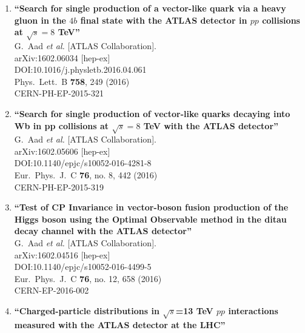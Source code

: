 \documentclass{article}
\begin{document}
\begin{enumerate}
\item%
{\bf ``Search for single production of a vector-like quark via a heavy gluon in the $4b$ final state with the ATLAS detector in $pp$ collisions at $\sqrt{s} = 8$ TeV''}
  \\{}G.~Aad {\it et al.} [ATLAS Collaboration].
  \\{}arXiv:1602.06034 [hep-ex]
  \\{}DOI:10.1016/j.physletb.2016.04.061
  \\{}Phys.\ Lett.\ B {\bf 758}, 249 (2016)
  \\{}CERN-PH-EP-2015-321
\item%
{\bf ``Search for single production of vector-like quarks decaying into Wb in pp collisions at $\sqrt{s} = 8$  TeV with the ATLAS detector''}
  \\{}G.~Aad {\it et al.} [ATLAS Collaboration].
  \\{}arXiv:1602.05606 [hep-ex]
  \\{}DOI:10.1140/epjc/s10052-016-4281-8
  \\{}Eur.\ Phys.\ J.\ C {\bf 76}, no. 8, 442 (2016)
  \\{}CERN-PH-EP-2015-319
\item%
{\bf ``Test of CP Invariance in vector-boson fusion production of the Higgs boson using the Optimal Observable method in the ditau decay channel with the ATLAS detector''}
  \\{}G.~Aad {\it et al.} [ATLAS Collaboration].
  \\{}arXiv:1602.04516 [hep-ex]
  \\{}DOI:10.1140/epjc/s10052-016-4499-5
  \\{}Eur.\ Phys.\ J.\ C {\bf 76}, no. 12, 658 (2016)
  \\{}CERN-EP-2016-002
\item%
{\bf ``Charged-particle distributions in $\sqrt{s}$=13 TeV $pp$ interactions measured with the ATLAS detector at the LHC''}

\end{enumerate}
\end{document}

